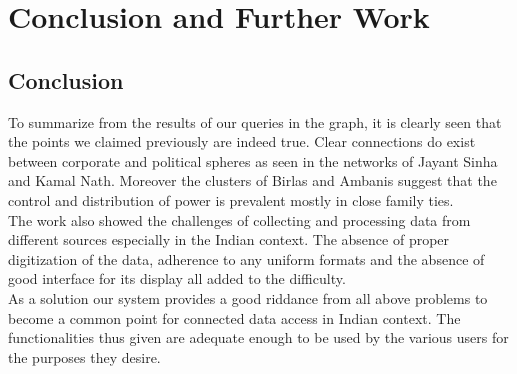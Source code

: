 \chapter{Conclusion and Further Work}
\section{Conclusion}

To summarize from the results of our queries in the graph, it is clearly seen that the points we claimed previously are indeed true. Clear connections do exist between corporate and political spheres as seen in the networks of Jayant Sinha and Kamal Nath. Moreover the clusters of Birlas and Ambanis suggest that the control and distribution of power is prevalent mostly in close family ties. \\

The work also showed the challenges of collecting and processing data from different sources especially in the Indian context. The absence of proper digitization of the data, adherence to any uniform formats and the absence of good interface for its display all added to the difficulty. \\

As a solution our system provides a good riddance from all above problems to become a common point for connected data access in Indian context. The functionalities thus given are adequate enough to be used by the various users for the purposes they desire. \\

